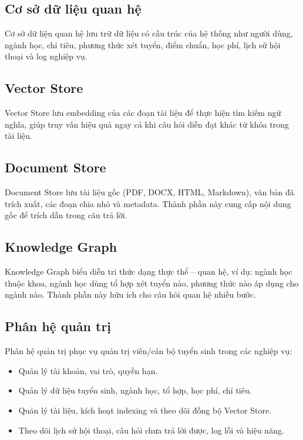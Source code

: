 \documentclass[12pt,a4paper]{report}
\begin{document}
\subsection{Cơ sở dữ liệu quan hệ}

Cơ sở dữ liệu quan hệ lưu trữ dữ liệu có cấu trúc của hệ thống như người dùng, ngành học, chỉ tiêu, phương thức xét tuyển, điểm chuẩn, học phí, lịch sử hội thoại và log nghiệp vụ.

\subsection{Vector Store}

Vector Store lưu embedding của các đoạn tài liệu để thực hiện tìm kiếm ngữ nghĩa, giúp truy vấn hiệu quả ngay cả khi câu hỏi diễn đạt khác từ khóa trong tài liệu.

\subsection{Document Store}

Document Store lưu tài liệu gốc (PDF, DOCX, HTML, Markdown), văn bản đã trích xuất, các đoạn chia nhỏ và metadata. Thành phần này cung cấp nội dung gốc để trích dẫn trong câu trả lời.

\subsection{Knowledge Graph}

Knowledge Graph biểu diễn tri thức dạng thực thể -- quan hệ, ví dụ: ngành học thuộc khoa, ngành học dùng tổ hợp xét tuyển nào, phương thức nào áp dụng cho ngành nào. Thành phần này hữu ích cho câu hỏi quan hệ nhiều bước.

\subsection{Phân hệ quản trị}

Phân hệ quản trị phục vụ quản trị viên/cán bộ tuyển sinh trong các nghiệp vụ:
\begin{itemize}
    \item Quản lý tài khoản, vai trò, quyền hạn.
    \item Quản lý dữ liệu tuyển sinh, ngành học, tổ hợp, học phí, chỉ tiêu.
    \item Quản lý tài liệu, kích hoạt indexing và theo dõi đồng bộ Vector Store.
    \item Theo dõi lịch sử hội thoại, câu hỏi chưa trả lời được, log lỗi và hiệu năng.
\end{itemize}
\end{document}
